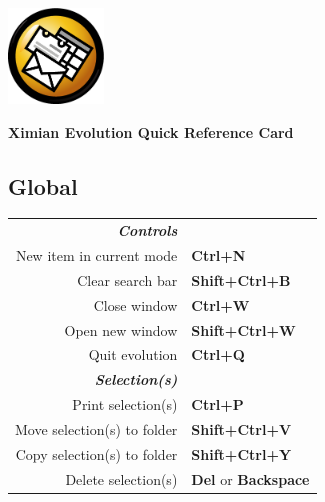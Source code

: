 \documentclass[12pt]{article}
\date {}
\begin{document}
	\begin{landscape}


	\begin{center}
	\begin{minipage}[m]
		{1in}\includegraphics[height=1in]{../evolution-logo.eps}\hspace{5mm}
	\end{minipage}
	\hspace{8mm}
	\textbf{\Huge{Ximian Evolution Quick Reference Card}}
	\end{center}

	\begin{center}
	\begin{multicols}{2}
	\section*{Global}
	\begin{tabular*}{4in}{rp{1.5in}}
		\textit{\textbf{Controls}}	&					\\
		New item in current mode		& \textbf{Ctrl+N}			\\
		Clear search bar			& \textbf{Shift+Ctrl+B}			\\
		Close window				& \textbf{Ctrl+W}			\\
		Open new window				& \textbf{Shift+Ctrl+W}			\\
		\vspace{1.5mm}
		Quit evolution				& \textbf{Ctrl+Q}			\\
		\textit{\textbf{Selection(s)}}		&					\\
		Print selection(s)			& \textbf{Ctrl+P}			\\
		Move selection(s) to folder		& \textbf{Shift+Ctrl+V}			\\
		Copy selection(s) to folder		& \textbf{Shift+Ctrl+Y}			\\
		Delete selection(s)			& \textbf{Del} or \textbf{Backspace}	\\
	\end{tabular*}

\end{multicols}
\end{center}
\end{landscape}
\end{document}
